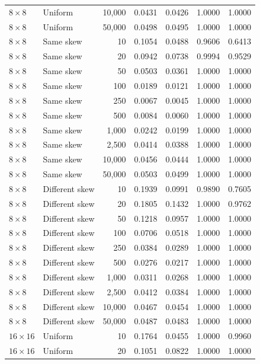 \begin{longtable}{@{}llrrrrr@{}}
\(8\times8\) & Uniform & 10,000 & 0.0431 & 0.0426 & 1.0000 & 1.0000\\
\(8\times8\) & Uniform & 50,000 & 0.0498 & 0.0495 & 1.0000 & 1.0000\\
\(8\times8\) & Same skew & 10 & 0.1054 & 0.0488 & 0.9606 & 0.6413\\
\(8\times8\) & Same skew & 20 & 0.0942 & 0.0738 & 0.9994 & 0.9529\\
\(8\times8\) & Same skew & 50 & 0.0503 & 0.0361 & 1.0000 & 1.0000\\
\(8\times8\) & Same skew & 100 & 0.0189 & 0.0121 & 1.0000 & 1.0000\\
\(8\times8\) & Same skew & 250 & 0.0067 & 0.0045 & 1.0000 & 1.0000\\
\(8\times8\) & Same skew & 500 & 0.0084 & 0.0060 & 1.0000 & 1.0000\\
\(8\times8\) & Same skew & 1,000 & 0.0242 & 0.0199 & 1.0000 & 1.0000\\
\(8\times8\) & Same skew & 2,500 & 0.0414 & 0.0388 & 1.0000 & 1.0000\\
\(8\times8\) & Same skew & 10,000 & 0.0456 & 0.0444 & 1.0000 & 1.0000\\
\(8\times8\) & Same skew & 50,000 & 0.0503 & 0.0499 & 1.0000 & 1.0000\\
\(8\times8\) & Different skew & 10 & 0.1939 & 0.0991 & 0.9890 & 0.7605\\
\(8\times8\) & Different skew & 20 & 0.1805 & 0.1432 & 1.0000 & 0.9762\\
\(8\times8\) & Different skew & 50 & 0.1218 & 0.0957 & 1.0000 & 1.0000\\
\(8\times8\) & Different skew & 100 & 0.0706 & 0.0518 & 1.0000 & 1.0000\\
\(8\times8\) & Different skew & 250 & 0.0384 & 0.0289 & 1.0000 & 1.0000\\
\(8\times8\) & Different skew & 500 & 0.0276 & 0.0217 & 1.0000 & 1.0000\\
\(8\times8\) & Different skew & 1,000 & 0.0311 & 0.0268 & 1.0000 & 1.0000\\
\(8\times8\) & Different skew & 2,500 & 0.0412 & 0.0384 & 1.0000 & 1.0000\\
\(8\times8\) & Different skew & 10,000 & 0.0467 & 0.0454 & 1.0000 & 1.0000\\
\(8\times8\) & Different skew & 50,000 & 0.0487 & 0.0483 & 1.0000 & 1.0000\\
\midrule
\(16\times16\) & Uniform & 10 & 0.1764 & 0.0455 & 1.0000 & 0.9960\\
\(16\times16\) & Uniform & 20 & 0.1051 & 0.0822 & 1.0000 & 1.0000\\

\end{longtable}
